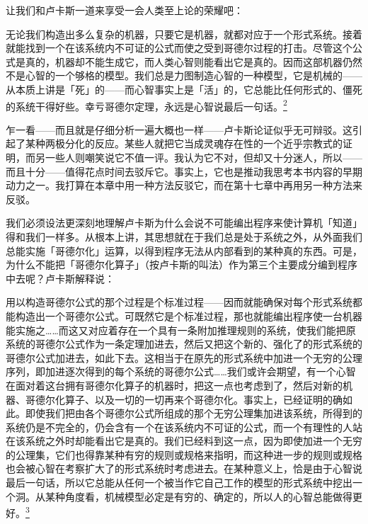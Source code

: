 \documentclass[
  12pt,
  twoside,
  openright,
  oldfontcommands,
]{memoir}
\newenvironment{fsquote}{%
  \begin{mdframed}[style=gebquote]\kaitifamily\small%
}{%
  \end{mdframed}%
}
\begin{document}
让我们和卢卡斯一道来享受一会人类至上论的荣耀吧：

\begin{fsquote}
无论我们构造出多么复杂的机器，只要它是机器，就都对应于一个形式系统。接着就能找到一个在该系统内不可证的公式而使之受到哥德尔过程的打击。尽管这个公式是真的，机器却不能生成它，而人类心智则能看出它是真的。因而这部机器仍然不是心智的一个够格的模型。我们总是力图制造心智的一种模型，它是机械的------从本质上讲是「死」的------而心智事实上是「活」的，它总能比任何形式的、僵死的系统干得好些。幸亏哥德尔定理，永远是心智说最后一句话。\hyperref[fn:Chapter15-2]{\textsuperscript{2}}
\end{fsquote}

乍一看------而且就是仔细分析一遍大概也一样------卢卡斯论证似乎无可辩驳。这引起了某种两极分化的反应。某些人就把它当成灵魂存在性的一个近乎宗教式的证明，而另一些人则嘲笑说它不值一评。我认为它不对，但却又十分迷人，所以------而且十分------值得花点时间去驳斥它。事实上，它也是推动我思考本书内容的早期动力之一。我打算在本章中用一种方法反驳它，而在第十七章中再用另一种方法来反驳。

我们必须设法更深刻地理解卢卡斯为什么会说不可能编出程序来使计算机「知道」得和我们一样多。从根本上讲，其思想就在于我们总是处于系统之外，从外面我们总能实施「哥德尔化」运算，以得到程序无法从内部看到的某种真的东西。可是，为什么不能把「哥德尔化算子」（按卢卡斯的叫法）作为第三个主要成分编到程序中去呢？卢卡斯解释说：

\begin{fsquote}
用以构造哥德尔公式的那个过程是个标准过程------因而就能确保对每个形式系统都能构造出一个哥德尔公式。可既然它是个标准过程，那也就能编出程序使一台机器能实施之\ldots\ldots 而这又对应着存在一个具有一条附加推理规则的系统，使我们能把原系统的哥德尔公式作为一条定理加进去，然后又把这个新的、强化了的形式系统的哥德尔公式加进去，如此下去。这相当于在原先的形式系统中加进一个无穷的公理序列，即加进逐次得到的每个系统的哥德尔公式\ldots\ldots 我们或许会期望，有一个心智在面对着这台拥有哥德尔化算子的机器时，把这一点也考虑到了，然后对新的机器、哥德尔化算子、以及一切的一切再来个哥德尔化。事实上，已经证明的确如此。即使我们把由各个哥德尔公式所组成的那个无穷公理集加进该系统，所得到的系统仍是不完全的，仍会含有一个在该系统内不可证的公式，而一个有理性的人站在该系统之外时却能看出它是真的。我们已经料到这一点，因为即使加进一个无穷的公理集，它们也得靠某种有穷的规则或规格来指明，而这种进一步的规则或规格也会被心智在考察扩大了的形式系统时考虑进去。在某种意义上，恰是由于心智说最后一句话，所以它总能从任何一个被当作它自己工作的模型的形式系统中挖出一个洞。从某种角度看，机械模型必定是有穷的、确定的，所以人的心智总能做得更好。\hyperref[fn:Chapter15-3]{\textsuperscript{3}}
\end{fsquote}
\end{document}
